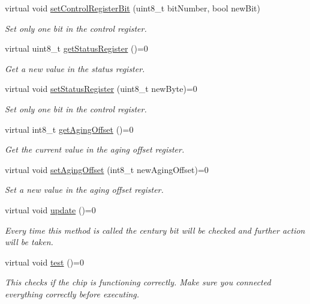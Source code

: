 \begin{DoxyCompactItemize}
virtual void \mbox{\hyperlink{classreal_time_clock_af9b7db85f78d01060772bdb3b397ea3c}{set\+Control\+Register\+Bit}} (uint8\+\_\+t bit\+Number, bool new\+Bit)
\begin{DoxyCompactList}\small\item\em Set only one bit in the control register. \end{DoxyCompactList}\item 
virtual uint8\+\_\+t \mbox{\hyperlink{classreal_time_clock_a38dcc51b0b30a5e480ea7f18f2c792ba}{get\+Status\+Register}} ()=0
\begin{DoxyCompactList}\small\item\em Get a new value in the status register. \end{DoxyCompactList}\item 
virtual void \mbox{\hyperlink{classreal_time_clock_aa8ee80a7056c67543834508d0f04a218}{set\+Status\+Register}} (uint8\+\_\+t new\+Byte)=0
\begin{DoxyCompactList}\small\item\em Set only one bit in the control register. \end{DoxyCompactList}\item 
virtual int8\+\_\+t \mbox{\hyperlink{classreal_time_clock_a2bc081385a6ad8273201d66217f8b2f0}{get\+Aging\+Offset}} ()=0
\begin{DoxyCompactList}\small\item\em Get the current value in the aging offset register. \end{DoxyCompactList}\item 
virtual void \mbox{\hyperlink{classreal_time_clock_aacf97da86677ee3fb55b5180ba5c0727}{set\+Aging\+Offset}} (int8\+\_\+t new\+Aging\+Offset)=0
\begin{DoxyCompactList}\small\item\em Set a new value in the aging offset register. \end{DoxyCompactList}\item 
virtual void \mbox{\hyperlink{classreal_time_clock_afb5132ca3cbe80552a88041cead0a2b3}{update}} ()=0
\begin{DoxyCompactList}\small\item\em Every time this method is called the century bit will be checked and further action will be taken. \end{DoxyCompactList}\item 
virtual void \mbox{\hyperlink{classreal_time_clock_a50cd1b4251b30814575a12269820ab8d}{test}} ()=0
\begin{DoxyCompactList}\small\item\em This checks if the chip is functioning correctly. Make sure you connected everything correctly before executing. \end{DoxyCompactList}\end{DoxyCompactItemize}
